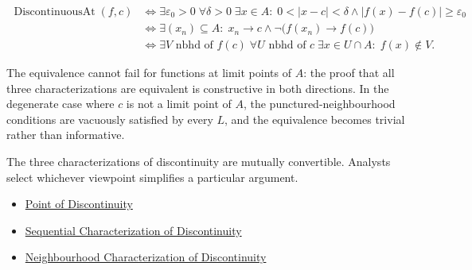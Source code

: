 \begin{remark*}
\[
\begin{aligned}
\operatorname{DiscontinuousAt}(f,c)
&\Longleftrightarrow
\exists \varepsilon_0>0\;\forall \delta>0\;\exists x\in A:\;0<|x-c|<\delta \land |f(x)-f(c)|\ge \varepsilon_0\\
&\Longleftrightarrow
\exists (x_n)\subseteq A:\; x_n \to c \land \neg\bigl(f(x_n)\to f(c)\bigr)\\
&\Longleftrightarrow
\exists V \text{ nbhd of } f(c)\;\forall U \text{ nbhd of } c\;\exists x\in U\cap A:\;f(x)\notin V.
\end{aligned}
\]
\end{remark*}

\begin{remark*}
The equivalence cannot fail for functions at limit points of $A$: the proof that all three characterizations are equivalent is constructive in both directions. In the degenerate case where $c$ is not a limit point of $A$, the punctured-neighbourhood conditions are vacuously satisfied by every $L$, and the equivalence becomes trivial rather than informative.
\end{remark*}

\begin{remark*}[Interpretation]
The three characterizations of discontinuity are mutually convertible. Analysts select whichever viewpoint simplifies a particular argument.
\end{remark*}

\begin{dependencies}
\begin{itemize}
  \item \hyperref[def:point-of-discontinuity]{Point of Discontinuity}
  \item \hyperref[def:sequential-discontinuity-at-a-point]{Sequential Characterization of Discontinuity}
  \item \hyperref[def:neighborhood-discontinuity-at-a-point]{Neighbourhood Characterization of Discontinuity}
\end{itemize}
\end{dependencies}


